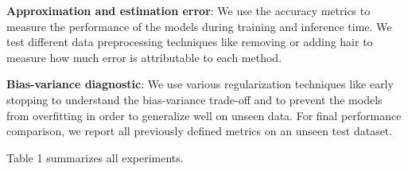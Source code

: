\textbf{Approximation and estimation error}: We use the accuracy metrics to measure the performance of the models during training and inference time. We test different data preprocessing techniques like removing or adding hair to measure how much error is attributable to each method.

\textbf{Bias-variance diagnostic}: We use various regularization techniques like early stopping to understand the bias-variance trade-off and to prevent the models from overfitting in order to generalize well on unseen data. For final performance comparison, we report all previously defined metrics on an unseen test dataset.

\par
Table 1 summarizes all experiments.

